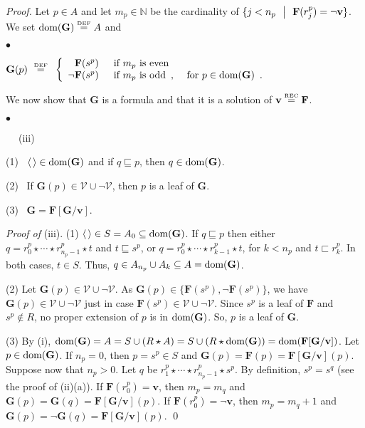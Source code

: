 \documentclass[copyright,creativecommons]{eptcs}
\newcommand{\vv}{\langle}
\newcommand{\ww}{\rangle}
\newcommand{\NN}{\mathbb{N}}
\newcommand{\eqdef}{\stackrel{\text{\tiny \textnormal{DEF}}}{=}}
\newcommand{\eqrec}{\stackrel{\text{\tiny \textnormal{REC}}}{=}}
\newcommand{\st}{ \ \ \big{|} \ \ }
\newcommand{\roo}{\vv \, \ww}
\newcommand{\cV}{\mathcal{V}}
\newcommand{\bF}{\mathbf{F}}
\newcommand{\bG}{\mathbf{G}}
\newcommand{\bbv}{\mathbf{v}}
\newcommand{\dom}{\ensuremath{\textnormal{dom}}}
\theoremstyle{definition}
\newcommand{\squishlist}{
 \begin{list}{$\bullet$}
  { \setlength{\itemsep}{0pt}
     \setlength{\parsep}{3pt}
     \setlength{\topsep}{3pt}
     \setlength{\partopsep}{0pt}
     \setlength{\leftmargin}{1em}
     \setlength{\labelwidth}{1.5em}
     \setlength{\labelsep}{0.5em} } }
\newcommand{\squishend}{
  \end{list}  }
\begin{document}
\begin{proof}
 Let $p \in A$ and
let
 $m_p \in \NN$   be the cardinality
of  $\{  j < n_p \st \bF(r^p_j) = \neg \bbv\}$. We  set
$\dom(\bG) \eqdef A$ and

\squishlist
\item[] {\centering
 ${\bG}(p) \ \eqdef \ $ $\left\{
  \begin{array}{rl}
    \bF(s^p)\enspace &  \hbox{if $m_p$ is even} \\
    \neg\bF(s^p)\enspace &  \hbox{if $m_p$ is odd\enspace, \quad for  $p  \in \dom(\bG)$\enspace.}   \end{array}
\right.$\par}
\squishend

We now show that $\bG$ is a formula and that it is a solution of $\bbv \eqrec \bF$.






\squishlist
\item[$\phantom{ab}$ (iii)]

(1) \  $\roo \in \dom(\bG)$ and if    $q \sqsubseteq p$, then $ q \in \dom(\bG)$.

\hspace{0.49cm}(2) \ If  $\bG(p) \in \cV \cup \neg \cV$,  then  $p$ is a leaf of $\bG$.

\hspace{0.49cm}(3) \ $\bG = \bF[\bG/\bbv]$.
 \squishend
 \noindent\emph{Proof of} (iii).
(1)  $\roo \in S = A_0 \subseteq  \dom(\bG)$.
If $q  \sqsubseteq p$ then  either $q =
 r^p_0 \star \cdots \star r^p_{n_p-1}\star t$ and $ t \sqsubseteq s^p$,
or $q= r^p_0 \star \cdots  \star r^p_{k-1}\star t$, for $ k < n_p$
and  $t \sqsubset r^p_k$. In both cases, $ t \in S$. Thus,   $q \in A_{n_p} \cup  A_k \subseteq A = \dom(\bG)$.

(2) Let  $\bG(p) \in \cV \cup \neg \cV$. As $\bG(p)\in \{\bF(s^p) ,\neg \bF(s^p) \}$, we have $\bG(p)\in \cV \cup \neg \cV$ just in case $\bF(s^p)\in \cV \cup \neg \cV$.
Since    $s^p$ is a leaf of $\bF$ and $s^p \notin R$,  no proper extension of $p$ is in $\dom(\bG)$.
So, $p$ is a leaf of $\bG$.


(3)  By (i), $\dom(\bG) = A = S \cup (R \star A) = S \cup (R \star \dom(\bG))  =
\dom(\bF[\bG/\bbv]) $.
Let  $ p  \in \dom(\bG)$.
If $n_p=0$, then  $p = s^p \in S$ and $\bG(p) = \bF(p) = \bF[\bG/\bbv](p)$.
Suppose now that $ n_p>0$.
 Let  $q $ be $r^p_{1} \star \cdots \star r^p_{n_p-1}\star s^p$. By definition, $s^p = s^q$ (see the proof of (ii)(a)).
If  $\bF(r^p_0) = \bbv$, then $m_p = m_{q}$ and
 $\bG(p) =   \bG(q)= \bF[\bG/\bbv](p)$.
If  $\bF(r^p_0) =  \neg \bbv$, then $m_p = m_{q} +1$ and
 $\bG(p) =\neg \bG(q)= \bF[\bG/\bbv](p)$. \qed



\end{proof}
\end{document}
